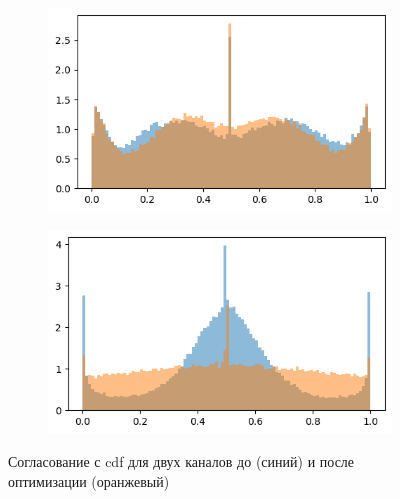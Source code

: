 \documentclass[a4paper,12pt]{article}
\begin{document}
		\begin{figure}[h!]
		\centering
		\begin{subfigure}{0.3\linewidth}
			\includegraphics[width=\linewidth]{plots/cdf_matching_1}
		\end{subfigure}
		\begin{subfigure}{0.3\linewidth}
			\includegraphics[width=\linewidth]{plots/cdf_matching_2}
		\end{subfigure}
		\caption{Согласование с cdf для двух каналов до (синий) и после оптимизации (оранжевый)}
	\end{figure}
	
\end{document}
